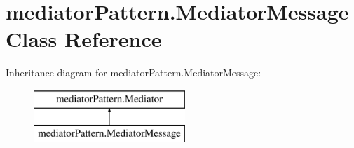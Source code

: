 \hypertarget{classmediator_pattern_1_1_mediator_message}{}\section{mediator\+Pattern.\+Mediator\+Message Class Reference}
\label{classmediator_pattern_1_1_mediator_message}
Inheritance diagram for mediator\+Pattern.\+Mediator\+Message\+:\begin{figure}[H]
\begin{center}
\leavevmode
\includegraphics[height=2.000000cm]{classmediator_pattern_1_1_mediator_message}
\end{center}
\end{figure}
